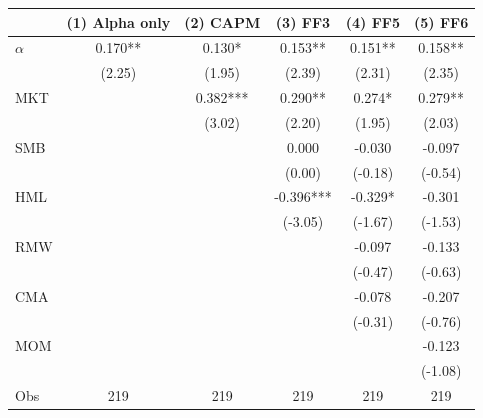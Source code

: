 \begin{tabular}{l*{5}{c}}
\toprule
 & (1) Alpha only & (2) CAPM & (3) FF3 & (4) FF5 & (5) FF6 \\
\midrule
$\alpha$ & 0.170** & 0.130* & 0.153** & 0.151** & 0.158** \\
 & (2.25) & (1.95) & (2.39) & (2.31) & (2.35) \\
MKT &  & 0.382*** & 0.290** & 0.274* & 0.279** \\
 &  & (3.02) & (2.20) & (1.95) & (2.03) \\
SMB &  &  & 0.000 & -0.030 & -0.097 \\
 &  &  & (0.00) & (-0.18) & (-0.54) \\
HML &  &  & -0.396*** & -0.329* & -0.301 \\
 &  &  & (-3.05) & (-1.67) & (-1.53) \\
RMW &  &  &  & -0.097 & -0.133 \\
 &  &  &  & (-0.47) & (-0.63) \\
CMA &  &  &  & -0.078 & -0.207 \\
 &  &  &  & (-0.31) & (-0.76) \\
MOM &  &  &  &  & -0.123 \\
 &  &  &  &  & (-1.08) \\
Obs & 219 & 219 & 219 & 219 & 219 \\
\bottomrule
\end{tabular}